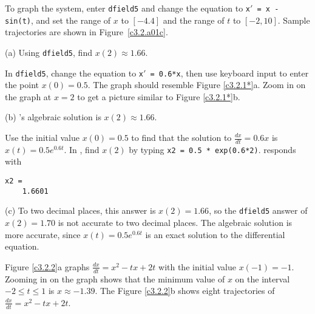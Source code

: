 \documentclass{ximera}
\begin{document}
To graph the system, enter {\tt dfield5} and change the equation to
{\tt x$'$ = x - sin(t)}, and set the range of $x$ to $[-4.4]$ and the
range of $t$ to $[-2,10]$.  Sample trajectories are shown in
Figure~\ref{c3.2.a01c}.

\begin{figure}[htb]
                       \centerline{%
                       }
\end{figure}

(a) \ans Using {\tt dfield5}, find $x(2) \approx 1.66$.

\soln In {\tt dfield5}, change the equation to {\tt x$'$ = 0.6*x}, then
use keyboard input to enter the point $x(0) = 0.5$.  The graph should
resemble Figure \ref{c3.2.1*}a.  Zoom in on the graph at $x = 2$ to get a
picture similar to Figure \ref{c3.2.1*}b.

(b) \ans \Matlabp's algebraic solution is $x(2) \approx 1.66$.

\soln Use the initial value $x(0) = 0.5$ to find that the solution to
$\frac{dx}{dt} = 0.6x$ is $x(t) = 0.5e^{0.6t}$.  In \Matlabp, find $x(2)$
by typing {\tt x2 = 0.5 * exp(0.6*2)}.
\Matlab responds with
\begin{verbatim}
x2 =
    1.6601
\end{verbatim}

(c) To two decimal places, this answer is $x(2) = 1.66$, so the
{\tt dfield5} answer of $x(2) = 1.70$ is not accurate to two decimal
places.  The algebraic solution is more accurate, since $x(t) = 0.5e^{0.6t}$
is an exact solution to the differential equation.

\begin{figure}[htb]
                       \centerline{%
                       }
\end{figure}

Figure \ref{c3.2.2}a graphs $\frac{dx}{dt} = x^2 -tx +2t$ with the
initial value $x(-1) = -1$.  Zooming in on the graph shows that the
minimum value of $x$ on the interval $-2 \leq t \leq 1$ is $x \approx
-1.39$.  The Figure \ref{c3.2.2}b shows eight trajectories of
$\frac{dx}{dt} = x^2 -tx +2t$.

\begin{figure}[htb]
                       \centerline{%
                       }
\end{figure}
\end{document}
